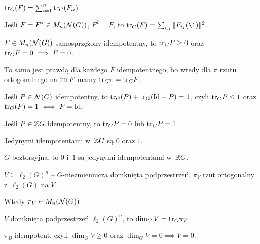 \begin{definicja}[ślad]
	${\mathrm{tr}}_G(F) = \sum_{i=1}^n {\mathrm{tr}}_G(F_{ii})$
\end{definicja}

\begin{lemat}
	Jeśli $F = F^\ast \in M_n({\mathcal{N}}(G))$, $F^2 = F$,
	to $\tr_G(F) = \sum_{i,j} \| F_{ij}(\1) \|^2$.
\end{lemat}

\begin{wniosek}
	$F \in M_n({\mathcal{N}}(G))$ samosprzężony idempotentny,
	to ${\mathrm{tr}}_G F \geq 0$ oraz ${{\mathrm{tr}}_G F = 0 \implies F = 0}$.
\end{wniosek}

\begin{uwaga}
	To samo jest prawdą dla każdego $F$ idempotentnego,
	bo wtedy dla $\pi$ rzutu ortogonalnego na ${\mathrm{im}\,} F$
	mamy ${\mathrm{tr}}_G \pi = {\mathrm{tr}}_G F$.
\end{uwaga}

\begin{stwierdzenie}
	Jeśli $P \in {\mathcal{N}}(G)$ idempotentny, to 
	${\mathrm{tr}}_G(P) + {\mathrm{tr}}_G({\mathrm{Id}}-P) = 1$, czyli
	${\mathrm{tr}}_G P \leq 1$ oraz ${\mathrm{tr}}_G(P) = 1 \iff P = {\mathrm{Id}}$.
\end{stwierdzenie}

\begin{uwaga}
	Jeśli $P \in {\mathbb{Z}} G$ idempotentny, to ${\mathrm{tr}}_G P = 0$ lub ${\mathrm{tr}}_G P = 1$.
\end{uwaga}

\begin{wniosek}
	Jedynymi idempotentami w~${\mathbb{Z}} G$ są $0$ oraz $1$.
\end{wniosek}

\begin{hipoteza}[Kaplonsky]
	$G$ beztorsyjna, to $0$ i~$1$ są jedynymi idempotentami w~${\mathbb{R}} G$.
\end{hipoteza}

\begin{fakt}
	$V \subseteq \ell_2(G)^n$ -- $G$-niezmiennicza domknięta 
	podprzestrzeń, $\pi_V$ rzut ortogonalny z~$\ell_2(G)$ na $V$.
	
	Wtedy $\pi_V \in M_n({\mathcal{N}}(G))$.
\end{fakt}

\begin{definicja}
	$V$ domknięta podprzestrzeń $\ell_2(G)^n$, to 
	${\dim_G V = {\mathrm{tr}}_G \pi_V}$
\end{definicja}

\begin{stwierdzenie}
	$\pi_B$ idempotent, czyli $\dim_G V \geq 0$ 
	oraz $\dim_G V = 0 \implies V = 0$.
\end{stwierdzenie}

